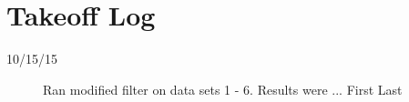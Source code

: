\section{Takeoff Log}

\begin{description}
\item [10/15/15]  Ran modified filter on data sets 1 - 6.  Results were ... \hfill{First Last}
\end{description}